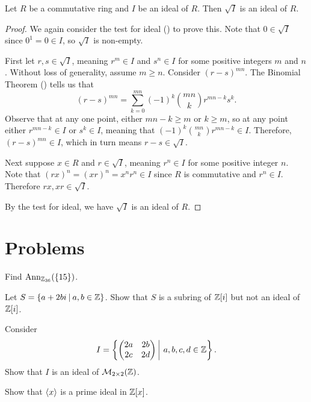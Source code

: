 \begin{proposition}
    Let $R$ be a commutative ring and $I$ be an ideal of $R$. Then $\sqrt{I}$ is an ideal of $R$.
\end{proposition}
\begin{proof}
    We again consider the test for ideal () to prove this. Note that $0 \in \sqrt{I}$ since $0^1 = 0 \in I$, so $\sqrt{I}$ is non-empty.

    First let $r, s \in \sqrt{I}$, meaning $r^m \in I$ and $s^n \in I$ for some positive integers $m$ and $n$. Without loss of generality, assume $m \geq n$. Consider $(r-s)^{mn}$. The Binomial Theorem () tells us that
    \[
        (r-s)^{mn} = \sum_{k=0}^{mn}(-1)^k{mn \choose k}r^{mn-k}s^k.
    \]
    Observe that at any one point, either $mn - k \geq m$ or $k \geq m$, so at any point either $r^{mn-k} \in I$ or $s^k \in I$, meaning that $(-1)^k{mn \choose k}r^{mn-k} \in I$. Therefore, $(r-s)^{mn} \in I$, which in turn means $r-s \in \sqrt{I}$.

    Next suppose $x \in R$ and $r \in \sqrt{I}$, meaning $r^n \in I$ for some positive integer $n$. Note that $(rx)^n = (xr)^n = x^nr^n \in I$ since $R$ is commutative and $r^n \in I$. Therefore $rx, xr \in \sqrt{I}$.

    By the test for ideal, we have $\sqrt{I}$ is an ideal of $R$.
\end{proof}

\newpage
\section{Problems}
\begin{problem}
    Find $\mathrm{Ann}_{\mathbb{Z}_{36}}(\{15\})$.
\end{problem}

\begin{problem}
    Let $S = \{a + 2bi \vert a, b \in \Z\}$. Show that $S$ is a subring of $\mathbb{Z}[i]$ but not an ideal of $\mathbb{Z}[i]$.
\end{problem}

\begin{problem}
    Consider
    \[
        I = \left\{\begin{pmatrix}2a&2b\\2c&2d\end{pmatrix} \vert a,b,c,d \in \Z\right\}.
    \]
    Show that $I$ is an ideal of $\mathcal{M}_{2\times2}(\mathbb{Z})$.
\end{problem}

\begin{problem}
    Show that $\left\langle x\right\rangle$ is a prime ideal in $\mathbb{Z}[x]$.
\end{problem}

